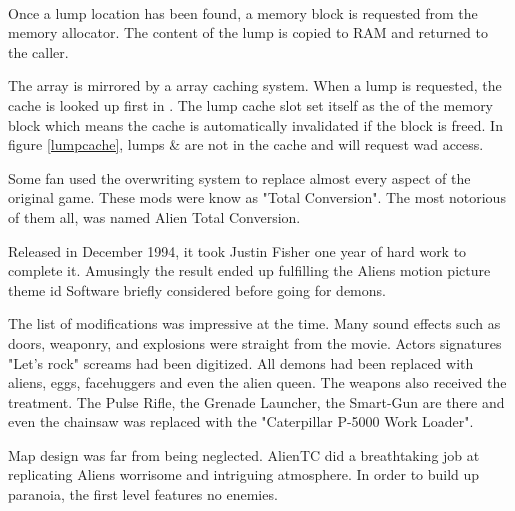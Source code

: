 \par
{}\\
\par
Once a lump location has been found, a memory block is requested from the memory allocator. The content of the lump is copied to RAM and returned to the caller. \\
\par
The  array is mirrored by a  array caching system. When a lump is requested, the cache is looked up first in . The lump cache slot set itself as the  of the memory block which means the cache is automatically invalidated if the block is freed. In figure \ref{lumpcache}, lumps  \&  are not in the cache and will request wad access.\\
\par
{}
\par
{}



Some fan used the overwriting system to replace almost every aspect of the original game. These mods were know as "Total Conversion". The most notorious of them all, was named Alien Total Conversion.\\
\par
Released in December 1994, it took Justin Fisher one year of hard work to complete it. Amusingly the result ended up fulfilling the Aliens motion picture theme id Software briefly considered before going for demons.\\
\par
 \par
 The list of modifications was impressive at the time. Many sound effects such as doors, weaponry, and explosions were straight from the movie. Actors signatures "Let's rock" screams had been digitized. All demons had been replaced with aliens, eggs, facehuggers and even the alien queen.
The weapons also received the treatment. The Pulse Rifle, the Grenade Launcher, the Smart-Gun are there and even the chainsaw was replaced with the "Caterpillar P-5000 Work Loader".\\
\par
Map design was far from being neglected. AlienTC did a breathtaking job at replicating Aliens worrisome and intriguing atmosphere. In order to build up paranoia, the first level features no enemies.
